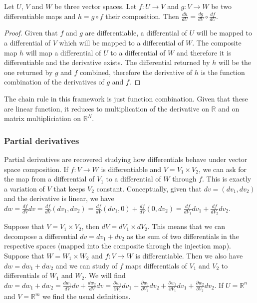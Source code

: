 \begin{prop}
	Let $U$, $V$ and $W$ be three vector spaces. Let $f : U \to V$ and $g : V \to W$ be two differentiable maps and $h = g \circ f$ their composition. Then $\frac{dh}{dU} = \frac{dg}{dV} \circ \frac{df}{dU}$.
\end{prop}

\begin{proof}
	Given that $f$ and $g$ are differentiable, a differential of $U$ will be mapped to a differential of $V$ which will be mapped to a differential of $W$. The composite map $h$ will map a differential of $U$ to a differential of $W$ and therefore it is differentiable and the derivative exists. The differential returned by $h$ will be the one returned by $g$ and $f$ combined, therefore the derivative of $h$ is the function combination of the derivatives of $g$ and $f$.
\end{proof}

\begin{remark}
	The chain rule in this framework is just function combination. Given that these are linear function, it reduces to multiplication of the derivative on $\mathbb{R}$ and on matrix multipliciation on $\mathbb{R}^N$.
\end{remark}


\subsubsection{Partial derivatives}

Partial derivatives are recovered studying how differentials behave under vector space composition. If $f : V \to W$ is differentiable and $V = V_1 \times V_2$, we can ask for the map from a differential of $V_1$ to a differential of $W$ through $f$. This is exactly a variation of $V$ that keeps $V_2$ constant. Conceptually, given that $dv = (dv_1, dv_2)$ and the derivative is linear, we have $dw = \frac{df}{dV} dv = \frac{df}{dV} (dv_1, dv_2) = \frac{df}{dV} (dv_1, 0) + \frac{df}{dV} (0, dv_2) = \frac{df}{dV_1} dv_1 + \frac{df}{dV_2} dv_2$.
	
Suppose that $V = V_1 \times V_2$, then $dV = dV_1 \times dV_2$. This means that we can decompose a differential $dv= dv_1 + dv_2$ as the sum of two differentials in the respective spaces (mapped into the composite through the injection map). Suppose that $W = W_1 \times W_2$ and $f : V \to W$ is differentiable. Then we also have $dw= dw_1 + dw_2$ and we can study of $f$ maps differentials of $V_1$ and $V_2$ to differentials of $W_1$ and $W_2$. We will find $dw = dw_1 + dw_2 = \frac{dw_1}{dV} dv + \frac{dw_2}{dV} dv = \frac{\partial w_1}{\partial V_1} dv_1 + \frac{\partial w_1}{\partial V_2} dv_2 + \frac{\partial w_2}{\partial V_1} dv_1 + \frac{\partial w_2}{\partial V_2} dv_2$. If $U = \mathbb{R}^n$ and $V = \mathbb{R}^m$ we find the usual definitions.

